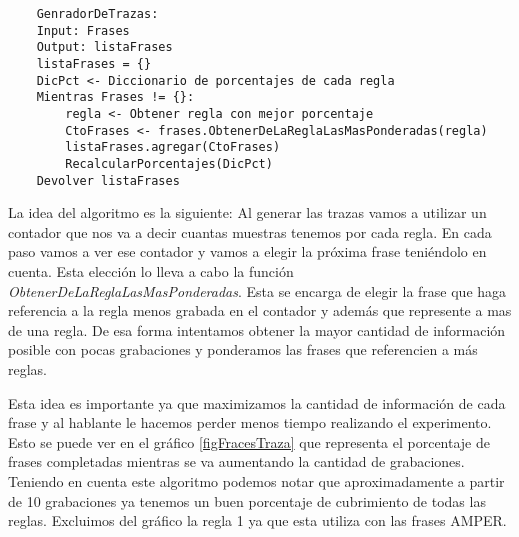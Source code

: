 \begin{lstlisting}
    GenradorDeTrazas:
    Input: Frases
    Output: listaFrases 
    listaFrases = {}
    DicPct <- Diccionario de porcentajes de cada regla
    Mientras Frases != {}:
    	regla <- Obtener regla con mejor porcentaje
    	CtoFrases <- frases.ObtenerDeLaReglaLasMasPonderadas(regla)
    	listaFrases.agregar(CtoFrases)
    	RecalcularPorcentajes(DicPct)
    Devolver listaFrases
\end{lstlisting}

La idea del algoritmo es la siguiente: Al generar las trazas vamos a utilizar un contador que nos va a decir cuantas muestras tenemos por cada regla. En cada paso vamos a ver ese contador y vamos a elegir la próxima frase teniéndolo en cuenta. Esta elección lo lleva a cabo la función \textit{ObtenerDeLaReglaLasMasPonderadas}. Esta se encarga de elegir la frase que haga referencia a la regla menos grabada en el contador y además que represente a mas de una regla. De esa forma intentamos obtener la mayor cantidad de información posible con pocas grabaciones y ponderamos las frases que referencien a más reglas. 

Esta idea es importante ya que maximizamos la cantidad de información de cada frase y al hablante le hacemos perder menos tiempo realizando el experimento. Esto se puede ver en el gráfico \ref{figFracesTraza} que representa el porcentaje de frases completadas mientras se va aumentando la cantidad de grabaciones. Teniendo en cuenta este algoritmo podemos notar que aproximadamente a partir de 10 grabaciones ya tenemos un buen porcentaje de cubrimiento de todas las reglas. Excluimos del gráfico la regla 1 ya que esta utiliza con las frases AMPER.

